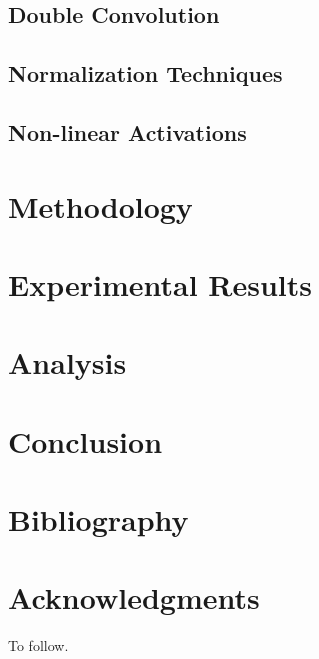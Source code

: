 \documentclass[acmsmall]{acmart}
\begin{document}
\subsection{Double Convolution}

\subsection{Normalization Techniques}

\subsection{Non-linear Activations}

\section{Methodology}

\section{Experimental Results}

\section{Analysis}

\section{Conclusion}

\section{Bibliography}

\section{Acknowledgments}

To follow.


\end{document}
